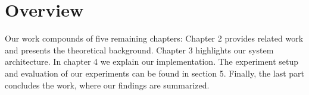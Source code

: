 
\section{Overview}

Our work compounds of five remaining chapters:
Chapter 2 provides related work and presents the theoretical background. Chapter 3 highlights our system architecture. In chapter 4 we explain our implementation. The experiment setup and evaluation of our experiments can be found in section 5. Finally, the last part concludes the work, where our findings are summarized.